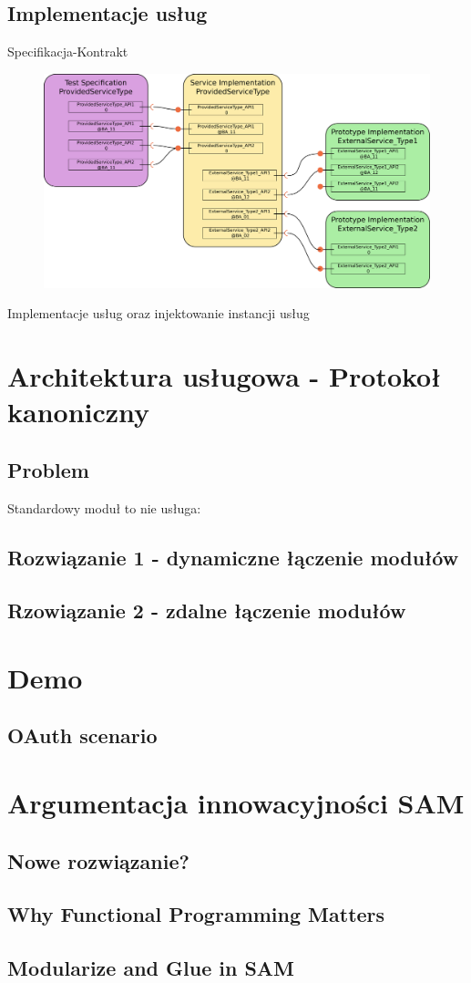 \documentclass[smaller]{beamer}
\begin{document}
\subsection{Implementacje usług}
\begin{frame}{Specifikacja-Kontrakt}
\begin{figure}
 \centering
 \includegraphics[width=1\textwidth]{servicePicture}
 \label{fig:serviceImplementation}
\end{figure}
Implementacje usług oraz injektowanie instancji usług
\end{frame}


\section{Architektura usługowa - Protokoł kanoniczny}
\subsection{Problem}
\begin{frame}
 Standardowy moduł to nie usługa:

\end{frame}

\subsection{Rozwiązanie 1 - dynamiczne łączenie modułów}

\subsection{Rzowiązanie 2 - zdalne łączenie modułów}


\section{Demo}
\subsection{OAuth scenario}

\section{Argumentacja innowacyjności SAM}
\subsection{Nowe rozwiązanie?}
\subsection{Why Functional Programming Matters}
\subsection{Modularize and Glue in SAM}
\end{document}
